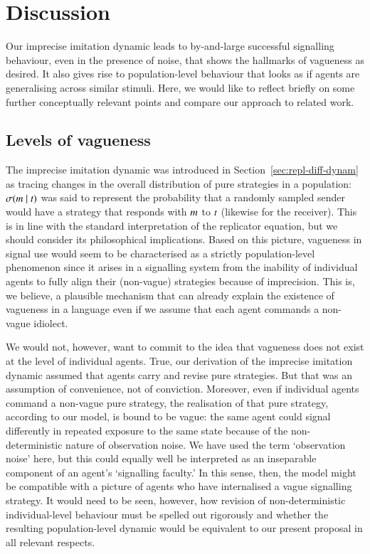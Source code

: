 \documentclass[12pt,english]{article}
\numberwithin{equation}{section}
\begin{document}

\section{Discussion}
\label{sec:discussion}

Our imprecise imitation dynamic leads to by-and-large successful signalling behaviour, even in
the presence of noise, that shows the hallmarks of vagueness as desired. It also gives rise to
population-level behaviour that looks as if agents are generalising across similar
stimuli. Here, we would like to reflect briefly on some further conceptually relevant points
and compare our approach to related work.

\subsection{Levels of vagueness}
The imprecise imitation dynamic was introduced in Section~\ref{sec:repl-diff-dynam} as tracing
changes in the overall distribution of pure strategies in a population:
$\sigma(m \mid t)$ was said to represent the probability that a randomly sampled
sender would have a strategy that responds with $m$ to $t$ (likewise for the
receiver). This is in line with the standard interpretation of the replicator equation, but we
should consider its philosophical implications. Based on this picture, vagueness in signal use
would seem to be characterised as a strictly population-level phenomenon since it arises in a
signalling system from the inability of individual agents to fully align their (non-vague)
strategies because of imprecision. This is, we believe, a plausible mechanism that can already
explain the existence of vagueness in a language even if we assume that each agent commands a
non-vague idiolect.

We would not, however, want to commit to the idea that vagueness does not exist at the level of
individual agents. True, our derivation of the imprecise imitation dynamic assumed that agents
carry and revise pure strategies. But that was an assumption of convenience, not of
conviction. Moreover, even if individual agents command a non-vague pure strategy, the
realisation of that pure strategy, according to our model, is bound to be vague: the same
agent could signal differently in repeated exposure to the same state because of the non-deterministic nature of observation noise. We have used the term
`observation noise' here, but this could equally well be interpreted as an
inseparable component of an agent's `signalling faculty.' In this sense, then, the model might
be compatible with a picture of agents who have internalised a vague signalling
strategy. It would need to be seen, however, how revision of non-deterministic individual-level
behaviour must be spelled out rigorously and whether the resulting population-level dynamic
would be equivalent to our present proposal in all relevant respects.
\end{document}
